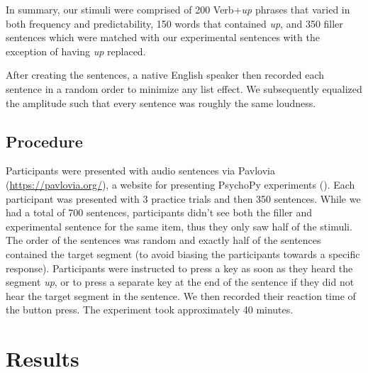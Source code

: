 \documentclass[
  12pt,
  letterpaper,
]{scrreprt}
\begin{document}
In summary, our stimuli were comprised of 200 Verb+\emph{up} phrases
that varied in both frequency and predictability, 150 words that
contained \emph{up}, and 350 filler sentences which were matched with
our experimental sentences with the exception of having \emph{up}
replaced.

After creating the sentences, a native English speaker then recorded
each sentence in a random order to minimize any list effect. We
subsequently equalized the amplitude such that every sentence was
roughly the same loudness.

\subsection{Procedure}\label{procedure-3}

Participants were presented with audio sentences via Pavlovia
(\url{https://pavlovia.org/}), a website for presenting PsychoPy
experiments ().
Each participant was presented with 3 practice trials and then 350
sentences. While we had a total of 700 sentences, participants didn't
see both the filler and experimental sentence for the same item, thus
they only saw half of the stimuli. The order of the sentences was random
and exactly half of the sentences contained the target segment (to avoid
biasing the participants towards a specific response). Participants were
instructed to press a key as soon as they heard the segment \emph{up},
or to press a separate key at the end of the sentence if they did not
hear the target segment in the sentence. We then recorded their reaction
time of the button press. The experiment took approximately 40 minutes.

\section{Results}\label{results-4}
\end{document}
